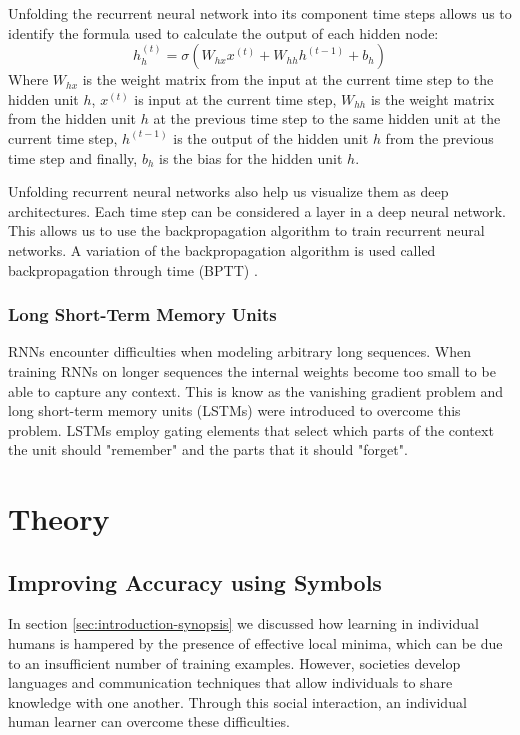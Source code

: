 \documentclass{article}
\begin{document}
	Unfolding the recurrent neural network into its component time steps allows us to identify the formula used to calculate the output of each hidden node:
	\begin{equation}
	h_{h}^{(t)} = \sigma(W_{hx} x^{(t)} + W_{hh} h^{(t - 1)} + b_{h})
	\end{equation}
	Where $W_{hx}$ is the weight matrix from the input at the current time step to the hidden unit $h$, $ x^{(t)}$ is input at the current time step, $W_{hh}$ is the weight matrix from the hidden unit $h$ at the previous time step to the same hidden unit at the current time step, $ h^{(t - 1)}$ is the output of the hidden unit $h$ from the previous time step and finally, $b_{h}$ is the bias for the hidden unit $h$\cite{DBLP:journals/corr/Lipton15}.
	
	Unfolding recurrent neural networks also help us visualize them as deep architectures. Each time step can be considered a layer in a deep neural network. This allows us to use the backpropagation algorithm to train recurrent neural networks. A variation of the backpropagation algorithm is used called backpropagation through time (BPTT) \cite{DBLP:journals/corr/Lipton15}.
	
	\subsubsection{Long Short-Term Memory Units}
	
	RNNs encounter difficulties when modeling arbitrary long sequences. When training RNNs on longer sequences the internal weights become too small to be able to capture any context. This is know as the vanishing gradient problem and long short-term memory units (LSTMs) were introduced to overcome this problem\cite{DBLP:journals/corr/Lipton15}. LSTMs employ gating elements that select which parts of the context the unit should "remember" and the parts that it should "forget"\cite{LSTM}.  
	
	\section{Theory}
	
	\subsection{Improving Accuracy using Symbols}
	
	In section \ref{sec:introduction-synopsis} we discussed how learning in individual humans is hampered by the presence of effective local minima, which can be due to an insufficient number of training examples. However, societies develop languages and communication techniques that allow individuals to share knowledge with one another. Through this social interaction, an individual human learner can overcome these difficulties\cite{DBLP:journals/corr/abs-1203-2990}.
	
\end{document}
